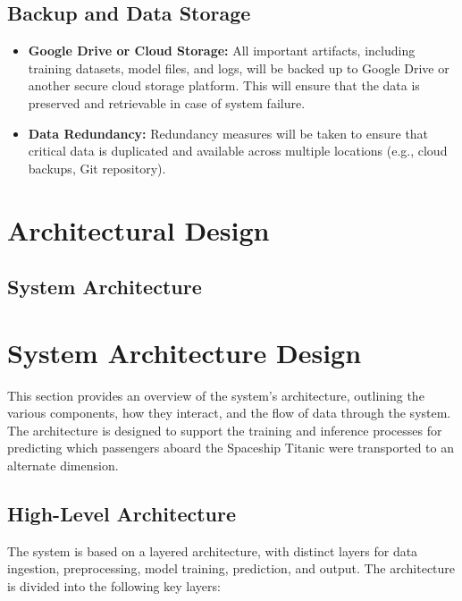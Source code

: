 \documentclass[15pt]{article}
\begin{document}
\subsection{Backup and Data Storage}

\begin{itemize}
    \item \textbf{Google Drive or Cloud Storage:} All important artifacts, including training datasets, model files, and logs, will be backed up to Google Drive or another secure cloud storage platform. This will ensure that the data is preserved and retrievable in case of system failure.
    \item \textbf{Data Redundancy:} Redundancy measures will be taken to ensure that critical data is duplicated and available across multiple locations (e.g., cloud backups, Git repository).
\end{itemize}

\section{Architectural Design}
\subsection{System Architecture}
\section{System Architecture Design}

This section provides an overview of the system’s architecture, outlining the various components, how they interact, and the flow of data through the system. The architecture is designed to support the training and inference processes for predicting which passengers aboard the Spaceship Titanic were transported to an alternate dimension.

\subsection{High-Level Architecture}

The system is based on a layered architecture, with distinct layers for data ingestion, preprocessing, model training, prediction, and output. The architecture is divided into the following key layers:
\end{document}
